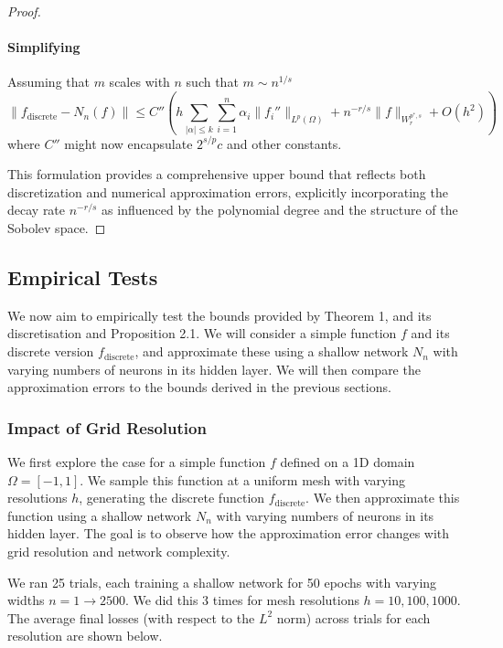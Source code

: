 \documentclass[11pt,a4paper]{article}
\theoremstyle{plain}
\theoremstyle{definition}
\theoremstyle{remark}
\begin{document}
\begin{proof}
\paragraph*{Simplifying}

Assuming that \( m \) scales with \( n \) such that \( m \sim n^{1/s} \)
\[
\|f_{\text{discrete}} - N_n(f)\| \leq C'' \left( h \sum_{|\alpha| \leq k} \sum_{i=1}^n \alpha_i \|f_i''\|_{L^p(\Omega)} + n^{-r/s} \|f\|_{W^{p^*,s}_r} + O(h^2) \right)
\]
where \( C'' \) might now encapsulate \( 2^{s/p} c \) and other constants.

This formulation provides a comprehensive upper bound that reflects both discretization and numerical approximation errors, explicitly incorporating the decay rate \( n^{-r/s} \) as influenced by the polynomial degree and the structure of the Sobolev space.
\end{proof}

\subsection{Empirical Tests}

We now aim to empirically test the bounds provided by Theorem 1, and its discretisation and Proposition 2.1. We will consider a simple function \( f \) and its discrete version \( f_{\text{discrete}} \), and approximate these using a shallow network \( N_n \) with varying numbers of neurons in its hidden layer. We will then compare the approximation errors to the bounds derived in the previous sections.

\subsubsection{Impact of Grid Resolution}

We first explore the case for a simple function \( f \) defined on a 1D domain \( \Omega = [-1, 1] \). We sample this function at a uniform mesh with varying resolutions \( h \), generating the discrete function \( f_{\text{discrete}} \). We then approximate this function using a shallow network \( N_n \) with varying numbers of neurons in its hidden layer. The goal is to observe how the approximation error changes with grid resolution and network complexity.

We ran 25 trials, each training a shallow network for 50 epochs with varying widths \( n = 1 \to 2500 \). We did this 3 times for mesh resolutions \( h = 10, 100, 1000 \). The average final losses (with respect to the \(L^2\) norm) across trials for each resolution are shown below.
\end{document}
